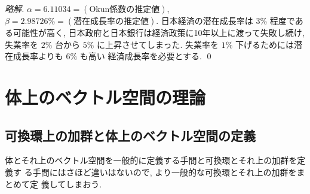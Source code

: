 \documentclass[12pt,twoside]{jarticle}
\newcommand\commentout[1]{#1}
\newcommand\commentout[1]{}
\begin{document}
\commentout{
\begin{proof}[略解]
  $\alpha=6.11034=(\text{Okun係数の推定値})$, 
  $\beta=2.98726\%=(\text{潜在成長率の推定値})$.
  日本経済の潜在成長率は $3\%$ 程度である可能性が高く,
  日本政府と日本銀行は経済政策に10年以上に渡って失敗し続け,
  失業率を $2\%$ 台から $5\%$ に上昇させてしまった.
  失業率を $1\%$ 下げるためには潜在成長率よりも $6\%$ も高い
  経済成長率を必要とする.
  \qed
\end{proof}
}


\section{体上のベクトル空間の理論}


\subsection{可換環上の加群と体上のベクトル空間の定義}

体とそれ上のベクトル空間を一般的に定義する手間と可換環とそれ上の加群を定義す
る手間にはさほど違いはないので, より一般的な可換環とそれ上の加群をまとめて定
義してしまおう.
\end{document}
